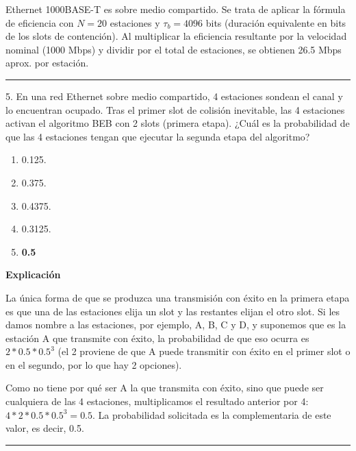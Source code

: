 \documentclass[10pt,a4paper]{article}
\begin{document}
Ethernet 1000BASE-T es sobre medio compartido. Se trata de aplicar la fórmula de eficiencia con $N = 20$
estaciones y $\tau_b = 4096$ bits (duración equivalente en bits de los slots de contención).
Al multiplicar la eficiencia resultante por la velocidad nominal (1000 Mbps) y dividir por el total de estaciones,
se obtienen 26.5 Mbps aprox. por estación.

\vspace{15pt} \hrule \vspace{15pt}


\pagebreak

5. En una red Ethernet sobre medio compartido, 4 estaciones sondean el canal y lo encuentran ocupado.
Tras el primer slot de colisión inevitable, las 4 estaciones activan el algoritmo BEB con 2 slots
(primera etapa). ¿Cuál es la probabilidad de que las 4 estaciones tengan que ejecutar la segunda etapa del
algoritmo?

\begin{enumerate}[label=\alph*]
    \item 0.125.
    \item 0.375.
    \item 0.4375.
    \item 0.3125.
    \item \textbf{0.5}
\end{enumerate}
\textbf{Explicación}

La única forma de que se produzca una transmisión con éxito en la primera etapa es que una de las estaciones
elija un slot y las restantes elijan el otro slot. Si les damos nombre a las estaciones, por ejemplo,
A, B, C y D, y suponemos que es la estación A que transmite con éxito, la probabilidad de que eso ocurra es
$2*0.5*0.5^3$ (el 2 proviene de que A puede transmitir con éxito en el primer slot o en el segundo,
por lo que hay 2 opciones).

Como no tiene por qué ser A la que transmita con éxito, sino que puede ser
cualquiera de las 4 estaciones, multiplicamos el resultado anterior por 4: $4*2*0.5*0.5^3 = 0.5$.
La probabilidad solicitada es la complementaria de este valor, es decir, 0.5.

\vspace{15pt} \hrule \vspace{15pt}
\end{document}
